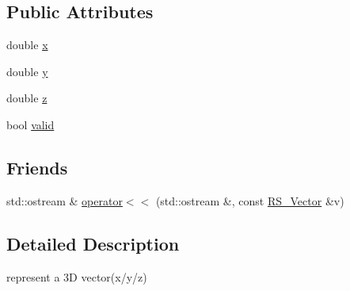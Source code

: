 \subsection*{Public Attributes}
\begin{DoxyCompactItemize}
\item 
double \hyperlink{class_r_s___vector_a81383ed1e6f744095698592fb7a4da87}{x}
\item 
double \hyperlink{class_r_s___vector_afb6a5512921abeaa92b9b7a1161a7657}{y}
\item 
double \hyperlink{class_r_s___vector_ac82be7d44c6e2848b6391fe22657ee74}{z}
\item 
bool \hyperlink{class_r_s___vector_a218a279eef9451516eb2f35473471f06}{valid}
\end{DoxyCompactItemize}
\subsection*{Friends}
\begin{DoxyCompactItemize}
\item 
std\-::ostream \& \hyperlink{class_r_s___vector_a8929105d6fd14cd1727b9262f1b1e632}{operator$<$$<$} (std\-::ostream \&, const \hyperlink{class_r_s___vector}{R\-S\-\_\-\-Vector} \&v)
\end{DoxyCompactItemize}


\subsection{Detailed Description}
represent a 3\-D vector(x/y/z) 

